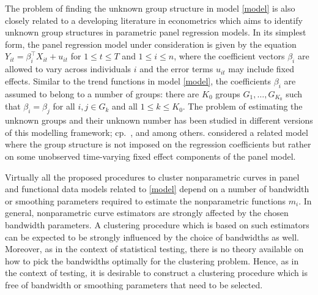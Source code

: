 \documentclass[a4paper,12pt]{article}
\begin{document}
The problem of finding the unknown group structure in model \eqref{model} is also closely related to a developing literature in econometrics which aims to identify unknown group structures in parametric panel regression models. In its simplest form, the panel regression model under consideration is given by the equation $Y_{it} = \beta_i^\top X_{it} + u_{it}$ for $1 \le t \le T$ and $1 \le i \le n$, where the coefficient vectors $\beta_i$ are allowed to vary across individuals $i$ and the error terms $u_{it}$ may include fixed effects. Similar to the trend functions in model \eqref{model}, the coefficients $\beta_i$ are assumed to belong to a number of groups: there are $K_0$ groups $G_1,\ldots,G_{K_0}$ such that $\beta_i = \beta_j$ for all $i,j \in G_k$ and all $1\le k \le K_0$. The problem of estimating the unknown groups and their unknown number has been studied in different versions of this modelling framework; cp.\ \cite{Su2016}, \cite{Su2018} and \cite{Wang2018} among others. \cite{Bonhomme2015} considered a related model where the group structure is not imposed on the regression coefficients but rather on some unobserved time-varying fixed effect components of the panel model. 


Virtually all the proposed procedures to cluster nonparametric curves in panel and functional data models related to \eqref{model} depend on a number of bandwidth or smoothing parameters required to estimate the nonparametric functions $m_i$. In general, nonparametric curve estimators are strongly affected by the chosen bandwidth parameters. A clustering procedure which is based on such estimators can be expected to be strongly influenced by the choice of bandwidths as well. Moreover, as in the context of statistical testing, there is no theory available on how to pick the bandwidths optimally for the clustering problem. Hence, as in the context of testing, it is desirable to construct a clustering procedure which is free of bandwidth or smoothing parameters that need to be selected. 


\end{document}
